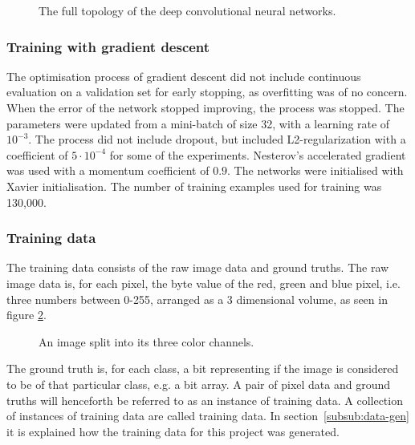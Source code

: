 \begin{figure}[H]
	\begin{scriptsize}
		\sffamily
		\def\svgwidth{\textwidth}
		
	\end{scriptsize}
	\caption{The full topology of the deep convolutional neural networks.}
	\label{fig:architectureOfDeepNet}
\end{figure}

\subsubsection{Training with gradient descent}
The optimisation process of gradient descent did not include continuous evaluation on a validation set for early stopping, as overfitting was of no concern. When the error of the network stopped improving, the process was stopped. The parameters were updated from a mini-batch of size 32, with a learning rate of $10^{-3}$. The process did not include dropout, but included L2-regularization with a coefficient of $5 \cdot 10^{-4}$ for some of the experiments. Nesterov's accelerated gradient was used with a momentum coefficient of $0.9$. The networks were initialised with Xavier initialisation. The number of training examples used for training was 130,000.

\subsubsection{Training data}
The training data consists of the raw image data and ground truths. The raw image data is, for each pixel, the byte value of the red, green and blue pixel, i.e. three numbers between 0-255, arranged as a 3 dimensional volume, as seen in figure \ref{fig:split}.

\begin{figure}[H]
    \centering
    
    \caption{An image split into its three color channels.}
    \label{fig:split}
\end{figure}
\noindent
The ground truth is, for each class, a bit representing if the image is considered to be of that particular class, e.g. a bit array. A pair of pixel data and ground truths will henceforth be referred to as an instance of training data. A collection of instances of training data are called training data.
In section~\ref{subsub:data-gen} it is explained how the training data for this project was generated.

